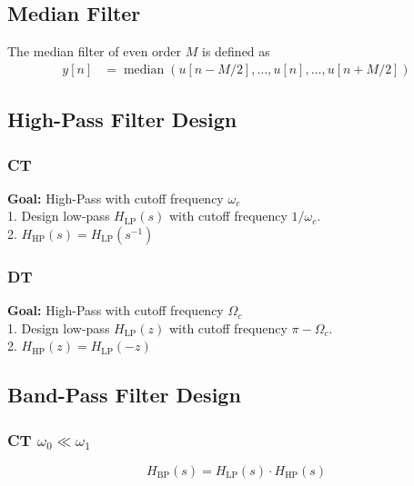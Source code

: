 
\subsection{Median Filter}
	The median filter of even order $M$ is defined as
	\begin{align*}
		y[n] &= \mathop{\text{median}}(u[n-M/2], \hdots, u[n],\hdots, u[n+M/2])
	\end{align*}

\subsection{High-Pass Filter Design}
	\subsubsection{CT}
		\textbf{Goal:} High-Pass with cutoff frequency $\omega_c$\\
		1. Design low-pass $H_\text{LP}(s)$ with cutoff frequency $1/\omega_c$.\\
		2. $H_\text{HP}(s) = H_\text{LP}(s^{-1})$

	\subsubsection{DT}
		\textbf{Goal:} High-Pass with cutoff frequency $\Omega_c$\\
		1. Design low-pass $H_\text{LP}(z)$ with cutoff frequency $\pi - \Omega_c$.\\
		2. $H_\text{HP}(z) = H_\text{LP}(-z)$

\subsection{Band-Pass Filter Design}
	\subsubsection{CT  \texorpdfstring{\hfill $\omega_0 \ll \omega_1$}{}}
		\vspace{-0.5em}$$H_\text{BP}(s) = H_\text{LP}(s) \cdot H_\text{HP}(s)$$
